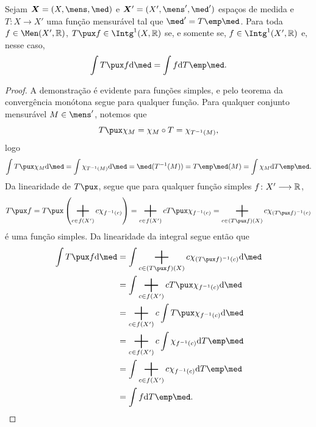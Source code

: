 \begin{prop}
Sejam $\bm X = (X,\mens,\med)$ e $\bm X'=(X',\mens',\med')$ espaços de medida e $T\colon X \to X'$ uma função mensurável tal que $\med' = T\emp\med$. Para toda $f \in \Men(X',\R)$, $T\pux f \in \Intg^1(X,\R)$ se, e somente se, $f \in \Intg^1(X',\R)$ e, nesse caso,
	\begin{equation*}
	\int T\pux f \dd\med = \int f \dd T\emp\med.
	\end{equation*}
\end{prop}
\begin{proof}
A demonstração é evidente para funções simples, e pelo teorema da convergência monótona segue para qualquer função. Para qualquer conjunto mensurável $M \in \mens'$, notemos que
	\begin{equation*}
	T\pux \idc_{M} = \idc_{M} \circ T = \idc_{T\inv(M)},
	\end{equation*}
logo
	\begin{equation*}
	\int T\pux \idc_{M} \dd\med = \int \idc_{T\inv(M)} \dd\med = \med(T\inv(M)) = T\emp\med(M) = \int \idc_M \dd T\emp\med.
	\end{equation*}
Da linearidade de $T\pux$, segue que para qualquer função simples $f\colon X' \longrightarrow \mathbb{R}$,%
	\begin{equation*}
	T\pux f = T\pux \left( \sum_{c \in f(X')} c\idc_{f\inv(c)} \right) = \sum_{c \in f(X')} c T\pux \idc_{f\inv(c)} = \sum_{c \in (T\pux f)(X)} c \idc_{(T\pux f)\inv(c)}
	\end{equation*}
é uma função simples. Da linearidade da integral segue então que
	\begin{align*}
	\int T\pux f \dd\med &= \int \sum_{c \in (T\pux f)(X)} c \idc_{(T\pux f)\inv(c)} \dd\med \\
		&= \int \sum_{c \in f(X')} c T\pux \idc_{f\inv(c)} \dd\med \\
		&= \sum_{c \in f(X')} c \int T\pux \idc_{f\inv(c)} \dd\med \\
		&= \sum_{c \in f(X')} c \int \idc_{f\inv(c)} \dd T\emp \med \\
		&= \int \sum_{c \in f(X')} c \idc_{f\inv(c)} \dd T\emp \med \\
		&= \int f \dd T\emp\med.
	\end{align*}

\end{proof}
